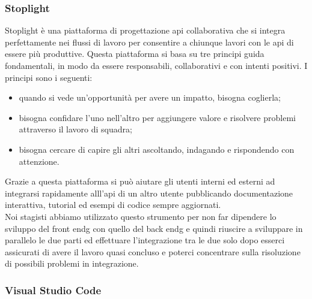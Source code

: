 \subsubsection{Stoplight}

Stoplight è una piattaforma di progettazione \gls{api} collaborativa che si integra perfettamente nei flussi di lavoro per consentire a chiunque lavori con le \gls{api} di essere più produttive. Questa piattaforma si basa su tre principi guida fondamentali, in modo da essere responsabili, collaborativi e con intenti positivi. I principi sono i seguenti:
\begin{itemize}
	\item quando si vede un'opportunità per avere un impatto, bisogna coglierla;
	\item bisogna confidare l'uno nell'altro per aggiungere valore e risolvere problemi attraverso il lavoro di squadra;
	\item bisogna cercare di capire gli altri ascoltando, indagando e rispondendo con attenzione.
\end{itemize}
Grazie a questa piattaforma si può aiutare gli utenti interni ed esterni ad integrarsi rapidamente alll'\gls{api} di un altro utente pubblicando documentazione interattiva, tutorial ed esempi di codice sempre aggiornati.\\
Noi stagisti abbiamo utilizzato questo strumento per non far dipendere lo sviluppo del \gls{front endg} con quello del \gls{back endg} e quindi riuscire a sviluppare in parallelo le due parti ed effettuare l'integrazione tra le due solo dopo esserci assicurati di avere il lavoro quasi concluso e poterci concentrare sulla risoluzione di possibili problemi in integrazione.

\subsubsection{Visual Studio Code}

